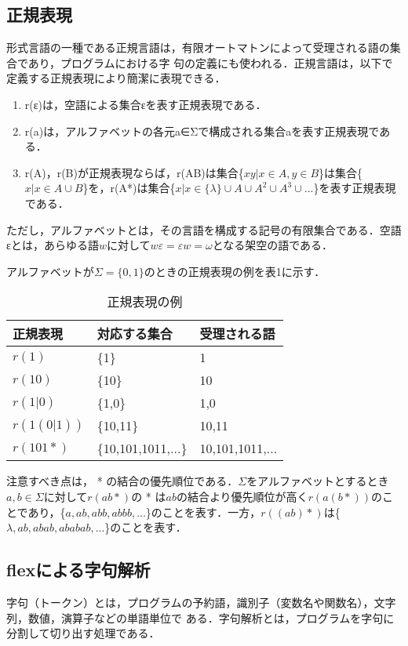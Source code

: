 \documentclass[a4j]{jsarticle}  %
\begin{document}
\subsection{正規表現}
形式言語の一種である正規言語は，有限オートマトンによって受理される語の集合であり，プログラムにおける字
句の定義にも使われる．正規言語は，以下で定義する正規表現により簡潔に表現できる．

\begin{enumerate}
\item r(ε)は，空語による集合{ε}を表す正規表現である．
\item r(a)は，アルファベットの各元a∈Σで構成される集合{a}を表す正規表現である．
\item r(A)，r(B)が正規表現ならば，r(AB)は集合\{$xy|x \in A,y \in B$\}は集合\{$x|x \in A \cup B$\}を，r(A*)は集合\{$x|x \in \{ λ \} \cup A \cup A^2 \cup A^3 \cup...$\}を表す正規表現である．
\end{enumerate}
ただし，アルファベットとは，その言語を構成する記号の有限集合である．空語εとは，あらゆる語$w$に対して$wε=εw=ω$となる架空の語である．

アルファベットが$\Sigma=\{0,1\}$のときの正規表現の例を表1に示す．

\begin{table}[htb]
  \begin{center}
    \caption{正規表現の例}
    \begin{tabular}{l|l|l}\hline
      正規表現 & 対応する集合 & 受理される語 \\ \hline
      $r(1)$ & \{1\} & 1 \\
      $r(10)$ & \{10\} & 10 \\
      $r(1|0)$ & \{1,0\} & 1,0 \\
      $r(1(0|1))$ & \{10,11\} & 10,11 \\
      $r(101*)$ & \{10,101,1011,...\} & 10,101,1011,... \\ \hline
    \end{tabular}
  \end{center}
\end{table}

注意すべき点は， * の結合の優先順位である．$\Sigma$をアルファベットとするとき$a,b\in\Sigma$に対して$r(ab*)$の * は$ab$の結合より優先順位が高く$r(a(b*))$のことであり，\{$a, ab, abb, abbb,...$\}のことを表す．一方，$r((ab)*)$は\{$λ, ab, abab, ababab,...$\}のことを表す．


\subsection{flexによる字句解析}
 字句（トークン）とは，プログラムの予約語，識別子（変数名や関数名），文字列，数値，演算子などの単語単位で
ある．字句解析とは，プログラムを字句に分割して切り出す処理である．
\end{document}
